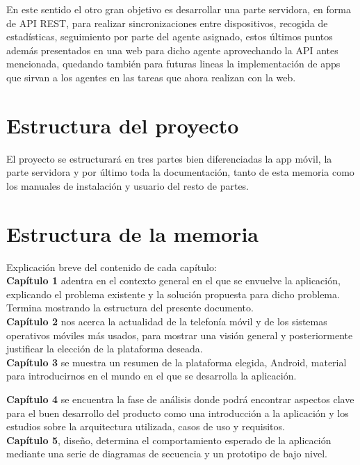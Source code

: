 \documentclass[../pfc.tex]{subfiles}
\begin{document}
En este sentido el otro gran objetivo es desarrollar una parte servidora, en forma de API REST, para realizar sincronizaciones entre dispositivos, recogida de estadísticas, seguimiento por parte del agente asignado, estos últimos puntos además presentados en una web para dicho agente aprovechando la API antes mencionada, quedando también para futuras lineas la implementación de apps que sirvan a los agentes en las tareas que ahora realizan con la web.\\

\section{Estructura del proyecto}

El proyecto se estructurará en tres partes bien diferenciadas la app móvil, la parte servidora y por último toda la documentación, tanto de esta memoria como los manuales de instalación y usuario del resto de partes. 

\section{Estructura de la memoria}

Explicación breve del contenido de cada capítulo:\\

  \textbf{Capítulo 1}  adentra en el contexto general en el que se envuelve la aplicación, explicando el problema existente y la solución propuesta para dicho problema. Termina mostrando la estructura del presente documento.\\
  
  \textbf{Capítulo 2} nos acerca la actualidad de la telefonía móvil y de los sistemas operativos móviles más usados, para mostrar una visión general y posteriormente justificar la elección de la plataforma deseada.\\
  
  \textbf{Capítulo 3} se muestra un resumen de la plataforma elegida, Android, material para introducirnos en el mundo en el que se desarrolla la aplicación.
  
  \textbf{Capítulo 4} se encuentra la fase de análisis donde podrá encontrar aspectos clave para el buen desarrollo del producto como una introducción a la aplicación y los estudios sobre la arquitectura utilizada, casos de uso y requisitos.\\
  
  \textbf{Capítulo 5}, diseño, determina el comportamiento esperado de la aplicación mediante una serie de diagramas de secuencia y un prototipo de bajo nivel.\\
  
\end{document}
